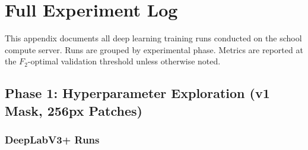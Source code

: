 \chapter{Full Experiment Log}
\label{appendix:all_runs}

This appendix documents all deep learning training runs conducted on the school compute server. Runs are grouped by experimental phase. Metrics are reported at the $F_2$-optimal validation threshold unless otherwise noted.

\section{Phase 1: Hyperparameter Exploration (v1 Mask, 256px Patches)}

\subsection{DeepLabV3+ Runs}

